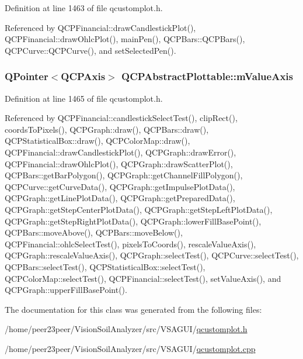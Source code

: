 Definition at line 1463 of file qcustomplot.\+h.



Referenced by Q\+C\+P\+Financial\+::draw\+Candlestick\+Plot(), Q\+C\+P\+Financial\+::draw\+Ohlc\+Plot(), main\+Pen(), Q\+C\+P\+Bars\+::\+Q\+C\+P\+Bars(), Q\+C\+P\+Curve\+::\+Q\+C\+P\+Curve(), and set\+Selected\+Pen().

\hypertarget{class_q_c_p_abstract_plottable_a2901452ca4aea911a1827717934a4bda}{}
\subsubsection[{m\+Value\+Axis}]{\setlength{\rightskip}{0pt plus 5cm}Q\+Pointer$<${\bf Q\+C\+P\+Axis}$>$ Q\+C\+P\+Abstract\+Plottable\+::m\+Value\+Axis\hspace{0.3cm}{\ttfamily [protected]}}\label{class_q_c_p_abstract_plottable_a2901452ca4aea911a1827717934a4bda}


Definition at line 1465 of file qcustomplot.\+h.



Referenced by Q\+C\+P\+Financial\+::candlestick\+Select\+Test(), clip\+Rect(), coords\+To\+Pixels(), Q\+C\+P\+Graph\+::draw(), Q\+C\+P\+Bars\+::draw(), Q\+C\+P\+Statistical\+Box\+::draw(), Q\+C\+P\+Color\+Map\+::draw(), Q\+C\+P\+Financial\+::draw\+Candlestick\+Plot(), Q\+C\+P\+Graph\+::draw\+Error(), Q\+C\+P\+Financial\+::draw\+Ohlc\+Plot(), Q\+C\+P\+Graph\+::draw\+Scatter\+Plot(), Q\+C\+P\+Bars\+::get\+Bar\+Polygon(), Q\+C\+P\+Graph\+::get\+Channel\+Fill\+Polygon(), Q\+C\+P\+Curve\+::get\+Curve\+Data(), Q\+C\+P\+Graph\+::get\+Impulse\+Plot\+Data(), Q\+C\+P\+Graph\+::get\+Line\+Plot\+Data(), Q\+C\+P\+Graph\+::get\+Prepared\+Data(), Q\+C\+P\+Graph\+::get\+Step\+Center\+Plot\+Data(), Q\+C\+P\+Graph\+::get\+Step\+Left\+Plot\+Data(), Q\+C\+P\+Graph\+::get\+Step\+Right\+Plot\+Data(), Q\+C\+P\+Graph\+::lower\+Fill\+Base\+Point(), Q\+C\+P\+Bars\+::move\+Above(), Q\+C\+P\+Bars\+::move\+Below(), Q\+C\+P\+Financial\+::ohlc\+Select\+Test(), pixels\+To\+Coords(), rescale\+Value\+Axis(), Q\+C\+P\+Graph\+::rescale\+Value\+Axis(), Q\+C\+P\+Graph\+::select\+Test(), Q\+C\+P\+Curve\+::select\+Test(), Q\+C\+P\+Bars\+::select\+Test(), Q\+C\+P\+Statistical\+Box\+::select\+Test(), Q\+C\+P\+Color\+Map\+::select\+Test(), Q\+C\+P\+Financial\+::select\+Test(), set\+Value\+Axis(), and Q\+C\+P\+Graph\+::upper\+Fill\+Base\+Point().



The documentation for this class was generated from the following files\+:\begin{DoxyCompactItemize}
\item 
/home/peer23peer/\+Vision\+Soil\+Analyzer/src/\+V\+S\+A\+G\+U\+I/\hyperlink{qcustomplot_8h}{qcustomplot.\+h}\item 
/home/peer23peer/\+Vision\+Soil\+Analyzer/src/\+V\+S\+A\+G\+U\+I/\hyperlink{qcustomplot_8cpp}{qcustomplot.\+cpp}\end{DoxyCompactItemize}
